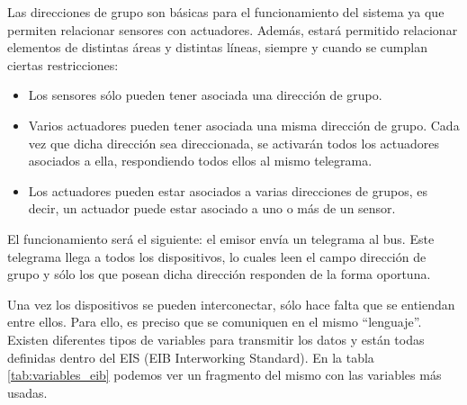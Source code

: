Las direcciones de grupo son básicas para el funcionamiento del sistema ya que permiten relacionar sensores con actuadores. Además, estará permitido relacionar elementos de distintas áreas y distintas líneas, siempre y cuando se cumplan ciertas restricciones:
\begin{itemize}
	\item Los sensores sólo pueden tener asociada una dirección de grupo.
	\item Varios actuadores pueden tener asociada una misma dirección de grupo. Cada vez que dicha dirección sea direccionada, se activarán todos los actuadores asociados a ella, respondiendo todos ellos al mismo telegrama.
	\item Los actuadores pueden estar asociados a varias direcciones de grupos, es decir, un actuador puede estar asociado a uno o más de un sensor.
\end{itemize}


El funcionamiento será el siguiente: el emisor envía un telegrama al bus. Este telegrama llega a todos los dispositivos, lo cuales leen el campo dirección de grupo y sólo los que posean dicha dirección responden de la forma oportuna.


Una vez los dispositivos se pueden interconectar, sólo hace falta que se entiendan entre ellos. Para ello, es preciso que se comuniquen en el mismo “lenguaje”. Existen diferentes tipos de variables para transmitir los datos y están todas definidas dentro del EIS (EIB Interworking Standard). En la tabla \ref{tab:variables_eib} podemos ver un fragmento del mismo con las variables más usadas.

